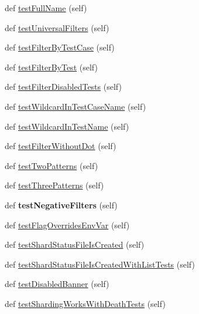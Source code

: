 \begin{DoxyCompactItemize}
\item 
def \mbox{\hyperlink{classgoogletest-filter-unittest_1_1GTestFilterUnitTest_a2fb67be78a3c92dcbae64479b220fe0f}{test\+Full\+Name}} (self)
\item 
def \mbox{\hyperlink{classgoogletest-filter-unittest_1_1GTestFilterUnitTest_a6b3267ec5eb1a4d335d2f969d28329dd}{test\+Universal\+Filters}} (self)
\item 
def \mbox{\hyperlink{classgoogletest-filter-unittest_1_1GTestFilterUnitTest_ac67334a27bf7aaf4d817d41e6bcd4469}{test\+Filter\+By\+Test\+Case}} (self)
\item 
def \mbox{\hyperlink{classgoogletest-filter-unittest_1_1GTestFilterUnitTest_a5665345aa2e94412fd65b19bc5077342}{test\+Filter\+By\+Test}} (self)
\item 
def \mbox{\hyperlink{classgoogletest-filter-unittest_1_1GTestFilterUnitTest_ada479753ed1c6007647252922f713ffc}{test\+Filter\+Disabled\+Tests}} (self)
\item 
def \mbox{\hyperlink{classgoogletest-filter-unittest_1_1GTestFilterUnitTest_a6bc13581aeb86a199706fd2592b5b5e5}{test\+Wildcard\+In\+Test\+Case\+Name}} (self)
\item 
def \mbox{\hyperlink{classgoogletest-filter-unittest_1_1GTestFilterUnitTest_a57c51a39e4e5578dc6e0a0dd47c2875c}{test\+Wildcard\+In\+Test\+Name}} (self)
\item 
def \mbox{\hyperlink{classgoogletest-filter-unittest_1_1GTestFilterUnitTest_a3a7d87e91ab92004b55affc8a0f76305}{test\+Filter\+Without\+Dot}} (self)
\item 
def \mbox{\hyperlink{classgoogletest-filter-unittest_1_1GTestFilterUnitTest_a7b2e7e1424bd6be9cbd15a401017c442}{test\+Two\+Patterns}} (self)
\item 
def \mbox{\hyperlink{classgoogletest-filter-unittest_1_1GTestFilterUnitTest_aab0836fe1e7c7c6af6b8b94f08475d3b}{test\+Three\+Patterns}} (self)
\item 
\mbox{\label{classgoogletest-filter-unittest_1_1GTestFilterUnitTest_a8484038c90290d2a4a50a3ab3601436e}} 
def {\bfseries test\+Negative\+Filters} (self)
\item 
def \mbox{\hyperlink{classgoogletest-filter-unittest_1_1GTestFilterUnitTest_a3cfc062fbcc396bfaa94184e10e3ae39}{test\+Flag\+Overrides\+Env\+Var}} (self)
\item 
def \mbox{\hyperlink{classgoogletest-filter-unittest_1_1GTestFilterUnitTest_a48fd50fa58d23ba0521a9388aea0c688}{test\+Shard\+Status\+File\+Is\+Created}} (self)
\item 
def \mbox{\hyperlink{classgoogletest-filter-unittest_1_1GTestFilterUnitTest_a7c436b2599ace8d6e32d17fd08a98178}{test\+Shard\+Status\+File\+Is\+Created\+With\+List\+Tests}} (self)
\item 
def \mbox{\hyperlink{classgoogletest-filter-unittest_1_1GTestFilterUnitTest_abc115685aa4d1502c481d5898247502b}{test\+Disabled\+Banner}} (self)
\item 
def \mbox{\hyperlink{classgoogletest-filter-unittest_1_1GTestFilterUnitTest_a8998f6f4842fa2cbde0428fa0c4ba437}{test\+Sharding\+Works\+With\+Death\+Tests}} (self)
\end{DoxyCompactItemize}


